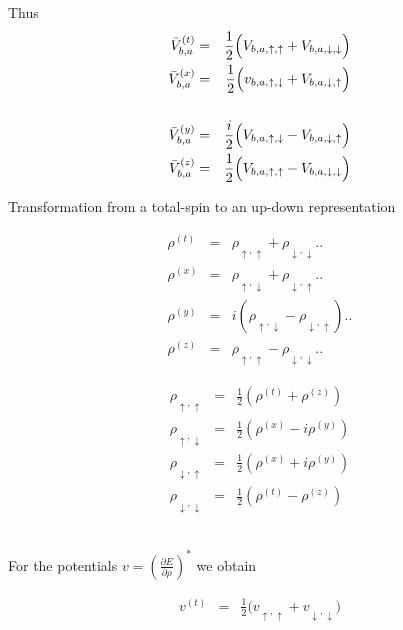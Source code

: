 \documentclass[11pt,a4paper]{report}
\begin{document}
Thus
\begin{eqnarray}
\bar{V}_{b,a}^{(t)}&=&\frac{1}{2}\Bigl(V_{b,a,\uparrow,\uparrow}
+V_{b,a,\downarrow,\downarrow}\Bigr)
\nonumber\\
\bar{V}_{b,a}^{(x)}&=&\frac{1}{2}\Bigl(v_{b,a,\uparrow,\downarrow}
+V_{b,a,\downarrow,\uparrow}\Bigr)
\nonumber\\
\nonumber\\
\bar{V}_{b,a}^{(y)}&=&\frac{i}{2}\Bigl(V_{b,a,\uparrow,\downarrow}
-V_{b,a,\downarrow,\uparrow}\Bigr)
\nonumber\\
\bar{V}_{b,a}^{(z)}&=&\frac{1}{2}\Bigl(V_{b,a,\uparrow,\uparrow}
-V_{b,a,\downarrow,\downarrow}\Bigr)
\end{eqnarray}

\begin{myshadowminipage}{Transformation from a total-spin 
to an up-down representation}
\begin{minipage}{0.45\linewidth}
\begin{eqnarray*}
  \rho^{(t)}&=&\rho_{\uparrow,\uparrow}+\rho_{\downarrow,\downarrow}\biggl.\biggr.
  \\
  \rho^{(x)}&=&\rho_{\uparrow,\downarrow}+\rho_{\downarrow,\uparrow}\biggl.\biggr.
  \\
  \rho^{(y)}&=&i(\rho_{\uparrow,\downarrow}-\rho_{\downarrow,\uparrow})\biggl.\biggr.
  \\
  \rho^{(z)}&=&\rho_{\uparrow,\uparrow}-\rho_{\downarrow,\downarrow}\biggl.\biggr.
\end{eqnarray*}
\end{minipage}
\begin{minipage}{0.45\linewidth}
\begin{eqnarray*}
\rho_{\uparrow,\uparrow}&=&\frac{1}{2}(\rho^{(t)}+\rho^{(z)})
\\
\rho_{\uparrow,\downarrow}&=&\frac{1}{2}(\rho^{(x)}-i\rho^{(y)})
\\
\rho_{\downarrow,\uparrow}&=&\frac{1}{2}(\rho^{(x)}+i\rho^{(y)})
\\
\rho_{\downarrow,\downarrow}&=&\frac{1}{2}(\rho^{(t)}-\rho^{(z)})
\end{eqnarray*}
\end{minipage}\\
For the potentials $v=\left(\frac{\partial E}{\partial\rho}\right)^*$ 
we obtain\\
\begin{minipage}{0.45\linewidth}
\begin{eqnarray*}
v^{(t)}&=&\frac{1}{2}\biggl(v_{\uparrow,\uparrow}+v_{\downarrow,\downarrow}\biggr)

\end{eqnarray*}
\end{minipage}
\end{myshadowminipage}
\end{document}
